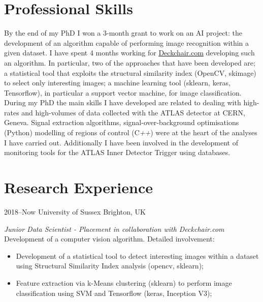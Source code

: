 \documentclass[print]{cv} %
\begin{document}

\section{Professional Skills}

By the end of my PhD I won a 3-month grant to work on an AI project: the development of an algorithm capable of performing image recognition within a given dataset. I have spent 4 months working for \href{http://www.deckchair.com}{Deckchair.com} developing such an algorithm. In particular, two of the approaches that have been developed are; a statistical tool that exploits the structural similarity index (OpenCV, skimage) to select only interesting images; a machine learning tool (sklearn,
keras, Tensorflow), in particular a support vector machine, for image classification. \\During my PhD the main skills I have developed are related to dealing with high-rates and high-volumes of data collected with the ATLAS detector at CERN, Geneva. Signal extraction algorithms, signal-over-background optimisations (Python) modelling of regions of control (C\textit{++}) were at the heart of the analyses I have carried out. Additionally I have been involved in the development of monitoring tools for the ATLAS Inner Detector Trigger using databases.

 \section{Research Experience}
  \begin{entrylist}
    \entry
    {2018--Now}
    {University of Sussex}
    {Brighton, UK}
    {\emph{Junior Data Scientist - Placement in collaboration with Deckchair.com} \\%
    Development of a computer vision algorithm. Detailed involvement:
    \begin{itemize}
      \item Development of a statistical tool to detect interesting images within a dataset using Structural Similarity Index analysis (opencv, sklearn);
      \item Feature extraction via k-Means clustering (sklearn) to perform image classification using SVM and Tensorflow (keras, Inception V3);
    \end{itemize}
    }
  \end{entrylist}
\end{document}

